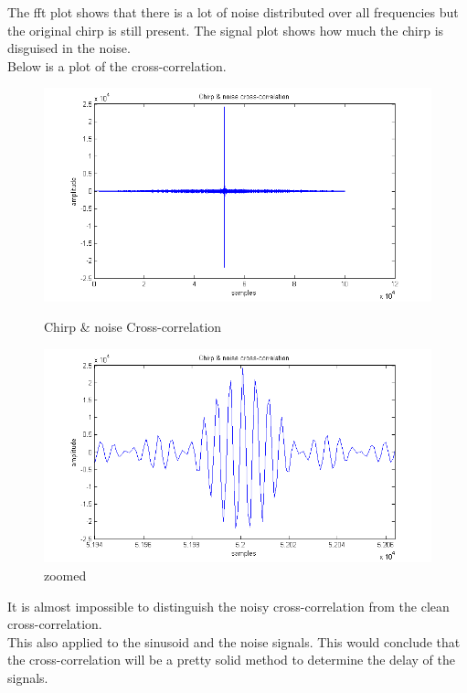The fft plot shows that there is a lot of noise distributed over all frequencies but the original chirp is still present. The signal plot shows how much the chirp is disguised in the noise.\\
Below is a plot of the cross-correlation.
\begin{figure}[H]
\begin{minipage}[b]{0.49\linewidth}
\centering
\includegraphics[width=1\textwidth]{billeder/chirp_noise_xcorr}
\caption{Chirp \& noise Cross-correlation}
\label{fig:figure1}
\end{minipage}
\hspace{0.5cm}
\begin{minipage}[b]{0.49\linewidth}
\centering
\includegraphics[width=1\textwidth]{billeder/chirp_noise_xcorr_zoom}
\caption{zoomed}
\label{fig:figure2}
\end{minipage}
\end{figure}
It is almost impossible to distinguish the noisy cross-correlation from the clean cross-correlation.\\
This also applied to the sinusoid and the noise signals. This would conclude that the cross-correlation will be a pretty solid method to determine the delay of the signals.\\


